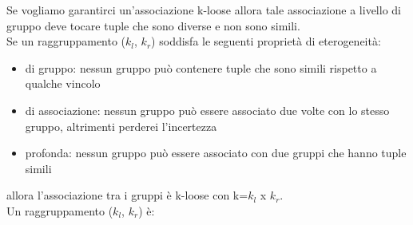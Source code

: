 Se vogliamo garantirci un'associazione k-loose allora tale associazione a livello di gruppo deve tocare tuple che sono diverse e non sono simili.\\
Se un raggruppamento (\(k_l\), \(k_r\)) soddisfa le seguenti proprietà di eterogeneità:
\begin{itemize}
    \item di gruppo: nessun gruppo può contenere tuple che sono simili rispetto a qualche vincolo
    \item di associazione: nessun gruppo può essere associato due volte con lo stesso gruppo, altrimenti perderei l'incertezza
    \item profonda: nessun gruppo può essere associato con due gruppi che hanno tuple simili
\end{itemize}
allora l'associazione tra i gruppi è k-loose con k=\(k_l\) x \(k_r\). \\
Un raggruppamento (\(k_l\), \(k_r\)) è:
